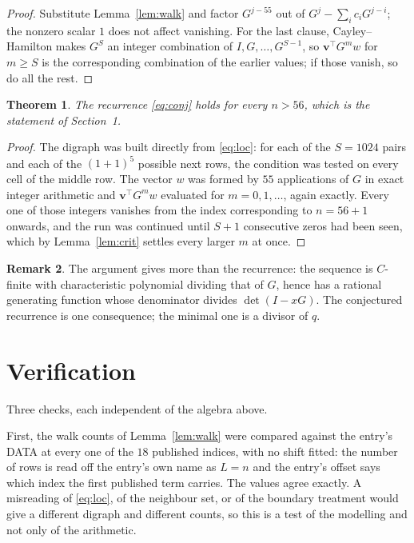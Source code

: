 \documentclass[11pt,a4paper]{article}
\theoremstyle{plain}
\newtheorem{theorem}{Theorem}
\theoremstyle{definition}
\newtheorem{remark}[theorem]{Remark}
\begin{document}
\begin{proof}
Substitute Lemma~\ref{lem:walk} and factor $G^{j-55}$ out of
$G^{j}-\sum_ic_iG^{j-i}$; the nonzero scalar $1$ does not affect
vanishing. For the last clause, Cayley--Hamilton makes $G^{S}$ an integer combination of
$I,G,\dots,G^{S-1}$, so $\mathbf{v}^{\!\top}G^{m}w$ for $m\ge S$ is the corresponding
combination of the earlier values; if those vanish, so do all the rest.
\end{proof}

\begin{theorem}
The recurrence \eqref{eq:conj} holds for every $n>56$, which is the statement of
Section~1.
\end{theorem}

\begin{proof}
The digraph was built directly from \eqref{eq:loc}: for each of the $S=1024$ pairs and each
of the $(1+1)^{5}$ possible next rows, the condition was tested on every cell of
the middle row. The vector $w$ was formed by $55$ applications of $G$ in exact integer
arithmetic and $\mathbf{v}^{\!\top}G^{m}w$ evaluated for $m=0,1,\dots$, again exactly.
Every one of those integers vanishes from the index corresponding to $n=56+1$ onwards,
and the run was continued until $S+1$ consecutive zeros had been seen, which by
Lemma~\ref{lem:crit} settles every larger $m$ at once.
\end{proof}

\begin{remark}
The argument gives more than the recurrence: the sequence is $C$-finite with characteristic
polynomial dividing that of $G$, hence has a rational generating function whose denominator
divides $\det(I-xG)$. The conjectured recurrence is one consequence; the minimal one is a
divisor of $q$.
\end{remark}

\section{Verification}

Three checks, each independent of the algebra above.

First, the walk counts of Lemma~\ref{lem:walk} were compared against the entry's DATA at
every one of the $18$ published indices, with no shift fitted: the number of rows is
read off the entry's own name as $L=n$ and the entry's offset says which index the first
published term carries. The values agree exactly. A misreading of \eqref{eq:loc}, of the
neighbour set, or of the boundary treatment would give a different digraph and different
counts, so this is a test of the modelling and not only of the arithmetic.
\end{document}
